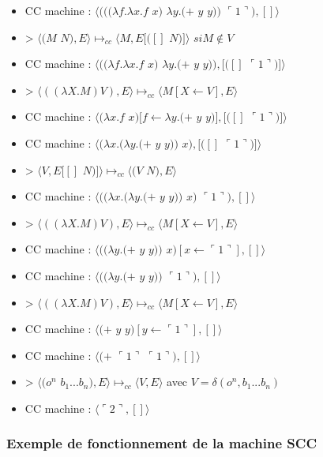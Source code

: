 \documentclass[10pt,a4paper]{article}
\begin{document}
					\begin{itemize}
						\item[] CC machine : $\langle(((\lambda f.\lambda x.f$ $x)$ $\lambda y.(+$ $y$ $y))$ $\ulcorner 1\urcorner),[]\rangle$
						\item[] > $\langle(M$ $N),E\rangle \longmapsto_{cc} \langle M,E[([]$ $N)]\rangle$ $si M \notin V$
						\item[] CC machine : $\langle((\lambda f.\lambda x.f$ $x)$ $\lambda y.(+$ $y$ $y)),[([]$ $\ulcorner 1\urcorner)]\rangle$
						\item[] > $\langle((\lambda X.M) V),E\rangle \longmapsto_{cc} \langle M[X\longleftarrow V],E\rangle$
						\item[] CC machine : $\langle(\lambda x.f$ $x)[f \leftarrow \lambda y.(+$ $y$ $y)],[([]$ $\ulcorner 1\urcorner)]\rangle$
						\item[] CC machine : $\langle(\lambda x.(\lambda y.(+$ $y$ $y))$ $x),[([]$ $\ulcorner 1\urcorner)]\rangle$
						\item[] > $\langle V,E[[]$ $N)]\rangle \longmapsto_{cc} \langle(V$ $N),E\rangle$ 
						\item[] CC machine : $\langle((\lambda x.(\lambda y.(+$ $y$ $y))$ $x)$ $\ulcorner 1\urcorner),[]\rangle$
						\item[] > $\langle((\lambda X.M) V),E\rangle \longmapsto_{cc} \langle M[X\longleftarrow V],E\rangle$
						\item[] CC machine : $\langle((\lambda y.(+$ $y$ $y))$ $x)[x \leftarrow \ulcorner 1\urcorner],[]\rangle$
						\item[] CC machine : $\langle((\lambda y.(+$ $y$ $y))$ $\ulcorner 1\urcorner),[]\rangle$
						\item[] > $\langle((\lambda X.M) V),E\rangle \longmapsto_{cc} \langle M[X\longleftarrow V],E\rangle$
						\item[] CC machine : $\langle(+$ $y$ $y)[y \leftarrow \ulcorner 1\urcorner],[]\rangle$
						\item[] CC machine : $\langle(+$ $\ulcorner 1\urcorner$ $\ulcorner 1\urcorner),[]\rangle$
						\item[] > $\langle(o^{n}$ $b_{1}...b_{n}),E\rangle \longmapsto_{cc}  \langle V,E\rangle$ avec $V = \delta(o^{n},b_{1}...b_{n})$
						\item[] CC machine : $\langle\ulcorner 2\urcorner,[]\rangle$
					\end{itemize}
				
				\subsubsection{Exemple de fonctionnement de la machine SCC}\label{SCC}
				
\end{document}
